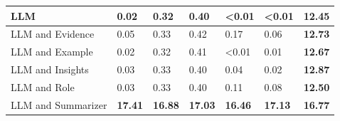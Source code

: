\begin{tabular}{|l|l|l|l|l|l|l|}
 \hline
 LLM & 0.02 & 0.32 & 0.40 & \textless{}0.01 & \textless{}0.01 & \textbf{12.45} \\
 \hline
 LLM and Evidence & 0.05 & 0.33 & 0.42 & 0.17 & 0.06 & \textbf{12.73} \\
 \hline
 LLM and Example & 0.02 & 0.32 & 0.41 & \textless{}0.01 & 0.01 & \textbf{12.67} \\
 \hline
 LLM and Insights & 0.03 & 0.33 & 0.40 & 0.04 & 0.02 & \textbf{12.87} \\
 \hline
 LLM and Role & 0.03 & 0.33 & 0.40 & 0.11 & 0.08 & \textbf{12.50} \\
 \hline
 LLM and Summarizer & \textbf{17.41} & \textbf{16.88} & \textbf{17.03} & \textbf{16.46} & \textbf{17.13} & \textbf{16.77} \\
\hline
\end{tabular}
